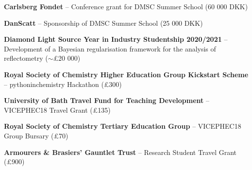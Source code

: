 \begin{cventriesy}
  \cventryy
    {
      \begin{cvitems}
      \item {\textbf{Carlsberg Fondet} -- Conference grant for DMSC Summer School (60 000 DKK)}
    \vspace{1mm}
      \item {\textbf{DanScatt} -- Sponsorship of DMSC Summer School (25 000 DKK)}
    \vspace{1mm}
        \item {\textbf{Diamond Light Source Year in Industry Studentship 2020/2021} -- Development of a Bayesian regularisation framework for the analysis of reflectometry ($\sim$£20 000)}
    \vspace{1mm}
        \item {\textbf{Royal Society of Chemistry Higher Education Group Kickstart Scheme} -- pythoninchemistry Hackathon (£300)}
    \vspace{1mm}
        \item {\textbf{University of Bath Travel Fund for Teaching Development} -- VICEPHEC18 Travel Grant (£135)}
    \vspace{1mm}
        \item {\textbf{Royal Society of Chemistry Tertiary Education Group} -- VICEPHEC18 Group Bursary (£70)}
    \vspace{1mm}
        \item {\textbf{Armourers \& Brasiers’ Gauntlet Trust} -- Research Student Travel Grant (£900)}
      \end{cvitems}
    }
\end{cventriesy}
